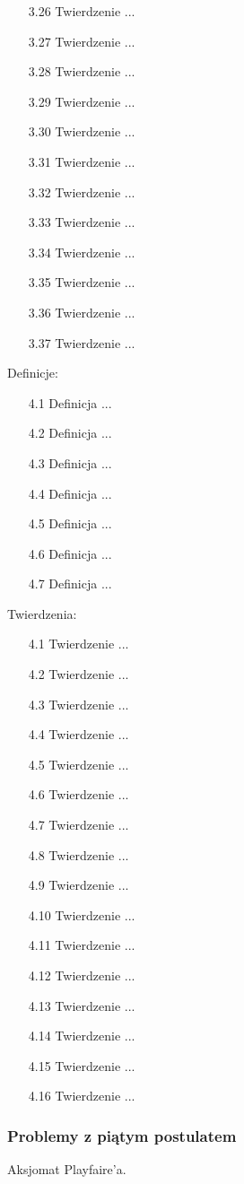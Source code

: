 \begin{enumerate}
\item [3.26] Twierdzenie ...
\item [3.27] Twierdzenie ...
\item [3.28] Twierdzenie ...
\item [3.29] Twierdzenie ...
\item [3.30] Twierdzenie ...
\item [3.31] Twierdzenie ...
\item [3.32] Twierdzenie ...
\item [3.33] Twierdzenie ...
\item [3.34] Twierdzenie ...
\item [3.35] Twierdzenie ...
\item [3.36] Twierdzenie ...
\item [3.37] Twierdzenie ...
\end{enumerate}
Definicje: \begin{enumerate}
\item [4.1] Definicja ...
\item [4.2] Definicja ...
\item [4.3] Definicja ...
\item [4.4] Definicja ...
\item [4.5] Definicja ...
\item [4.6] Definicja ...
\item [4.7] Definicja ...
\end{enumerate} Twierdzenia: \begin{enumerate}
\item [4.1] Twierdzenie ...
\item [4.2] Twierdzenie ...
\item [4.3] Twierdzenie ...
\item [4.4] Twierdzenie ...
\item [4.5] Twierdzenie ...
\item [4.6] Twierdzenie ...
\item [4.7] Twierdzenie ...
\item [4.8] Twierdzenie ...
\item [4.9] Twierdzenie ...
\item [4.10] Twierdzenie ...
\item [4.11] Twierdzenie ...
\item [4.12] Twierdzenie ...
\item [4.13] Twierdzenie ...
\item [4.14] Twierdzenie ...
\item [4.15] Twierdzenie ...
\item [4.16] Twierdzenie ...
\end{enumerate}

\subsubsection{Problemy z piątym postulatem}
Aksjomat Playfaire'a.